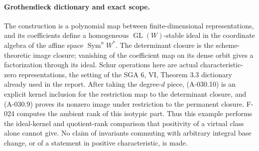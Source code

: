\paragraph{Grothendieck dictionary and exact scope.}
The construction is a polynomial map between finite-dimensional
representations, and its coefficients define a homogeneous
\(\operatorname{GL}(W)\)-stable ideal in the coordinate algebra
of the affine space \(\operatorname{Sym}^nW^*\). The determinant
closure is the scheme-theoretic image closure; vanishing of the
coefficient map on its dense orbit gives a factorization through
its ideal. Schur operations here are actual characteristic-zero
representations, the setting of the SGA 6, VI, Theorem 3.3
dictionary already used in the report. After taking the degree-\(d\)
piece, (A-030.10) is an explicit kernel inclusion for the
restriction map to the determinant closure, and (A-030.9)
proves its nonzero image under restriction to the permanent
closure. F-024 computes the ambient rank of this isotypic part.
Thus this example performs the ideal-kernel and quotient-rank
comparison that positivity of a virtual class alone cannot give.
No claim of invariants commuting with arbitrary integral base
change, or of a statement in positive characteristic, is made.
